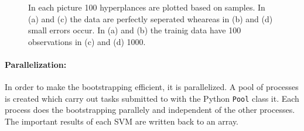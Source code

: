 \documentclass[a4paper]{article}
\begin{document}
\begin{figure}[!htb]
\begin{center}

\caption{In each picture 100 hyperplances are plotted based on samples. In (a) and (c) the data are perfectly seperated wheareas in (b) and (d) small errors occur. In (a) and (b) the trainig data have 100 observations in (c) and (d) 1000.}
\label{fig2}
\end{center}
\end{figure}

\paragraph{Parallelization:} In order to make the bootstrapping efficient, it is parallelized. A pool of processes is created which carry out tasks submitted to with the Python \texttt{Pool} class it. Each process does the bootstrapping parallely and independent of the other processes. The important results of each SVM are written back to an array.
\end{document}
